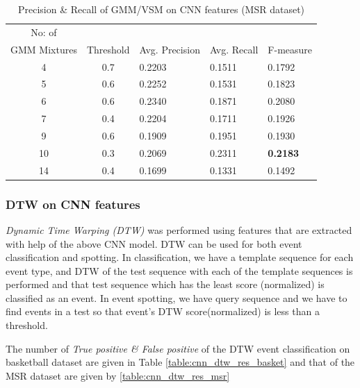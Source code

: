 \begin{table}[h]
\caption[Event spotting using GMM/VSM on CNN (on pre-processed input) features (MSR Action Dataset II) ]{ Precision \& Recall  of GMM/VSM on CNN features (MSR dataset)}
\label{table:cnn_gmm_res_msr}
\centering
\begin{tabular}{|c|c|l|l|l|}
\hline
No: of &&&&\\
GMM Mixtures & Threshold & Avg. Precision & Avg. Recall & F-measure\\
\hline
\hline
 4 	&0.7 	&0.2203 	& 0.1511	&0.1792\\
 5 	&0.6 	&0.2252 	& 0.1531	&0.1823\\
 6 	&0.6 	&0.2340 	& 0.1871	&0.2080\\
 7 	&0.4 	&0.2204 	& 0.1711	&0.1926\\
 9 	&0.6 	&0.1909 	& 0.1951	&0.1930\\
10 	&0.3 	&0.2069 	& 0.2311	&\textbf{0.2183}\\
14 	&0.4 	&0.1699 	& 0.1331	&0.1492\\
\hline  
\end{tabular}
\end{table} 


\subsubsection{DTW on CNN features}
\textit{Dynamic Time Warping (DTW)} was performed using features that are extracted with help of the above CNN model.  DTW can be used for both event classification and spotting.  In classification, we have a template sequence for each event type, and DTW of the test sequence with each of the template sequences is performed and that test sequence which has the least score (normalized) is classified as an event.  In event spotting, we have query sequence and we have to find events in a test so that event's DTW score(normalized) is less than a threshold.


The number of \textit{True positive \& False positive} of the DTW event classification on basketball dataset are given in Table \ref{table:cnn_dtw_res_basket} and that of the MSR dataset are given by \ref{table:cnn_dtw_res_msr}

